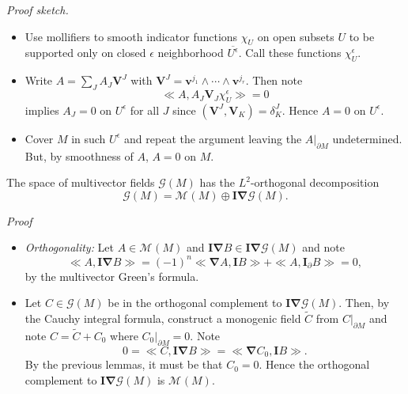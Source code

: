 \documentclass[aspectratio=169,handout]{beamer}
\newcommand{\grad}{\boldsymbol{\nabla}}
\newcommand{\G}{\mathcal{G}}
\newcommand{\blade}[1]{\boldsymbol{#1}}
\newcommand{\multivecinnerproduct}[2]{\ll #1, #2\gg}
\newcommand{\boundary}{{\partial M}}
\newcommand{\pseudoscalar}{\blade{I}}
\newcommand{\monogenicfields}[1]{\mathcal{M}^{#1}(M)}
\begin{document}
\begin{frame}{}
\vfill
\emph{Proof sketch.}
\begin{itemize}
\item Use mollifiers to smooth indicator functions $\chi_U$ on open subsets $U$ to be supported only on closed $\epsilon$ neighborhood $\overline{U^\epsilon}$. Call these functions $\chi_U^\epsilon$.
\item Write $A=\sum_J A_J \blade{V}^J$ with $\blade{V}^J = \blade{v}^{j_1}\wedge \cdots\wedge  \blade{v}^{j_r}$. Then note
    \[
    \multivecinnerproduct{A}{A_J \blade{V}_J \chi_U^\epsilon} = 0
    \] 
    implies $A_J=0$ on $U^\epsilon$ for all $J$ since $(\blade{V}^{J}, \blade{V}_K)=\delta^J_K$. Hence $A=0$ on $U^\epsilon$.
\item Cover $M$ in such $U^\epsilon$ and repeat the argument leaving the $A\vert_\boundary$ undetermined. But, by smoothness of $A$, $A=0$ on $M$.
\end{itemize}
\vfill
\end{frame}

\begin{frame}{}
\vfill
\begin{theorem}
The space of multivector fields $\G(M)$ has the $L^2$-orthogonal decomposition
\[
\G(M) = \monogenicfields{} \oplus \pseudoscalar \grad \G(M).
\]
\end{theorem}
\vfill
\end{frame}

\begin{frame}
\vfill
\emph{Proof}
\begin{itemize}
\item \emph{Orthogonality:} Let $A \in \monogenicfields{}$ and $\pseudoscalar \grad B \in \pseudoscalar \grad \G(M)$ and note
\[
\multivecinnerproduct{A}{\pseudoscalar \grad B} = (-1)^n \multivecinnerproduct{\grad A}{\pseudoscalar B} + \multivecinnerproduct{A}{\pseudoscalar_\partial B} = 0,
\]
by the multivector Green's formula.
\end{itemize}
\vfill
\end{frame}

\begin{frame}{}
\vfill
\begin{itemize}
\item Let $C\in \G(M)$ be in the orthogonal complement to $\pseudoscalar \grad \G(M)$. Then, by the Cauchy integral formula, construct a monogenic field $\tilde{C}$ from $C\vert_\boundary$ and note $C=\tilde{C}+C_0$ where $C_0\vert_\boundary = 0$. Note
\[
0 = \multivecinnerproduct{C}{\pseudoscalar \grad B} = \multivecinnerproduct{\grad C_0}{\pseudoscalar B}.
\]
By the previous lemmas, it must be that $C_0=0$. Hence the orthogonal complement to $\pseudoscalar \grad \G(M)$ is $\monogenicfields{}$.
\end{itemize}
\vfill
\end{frame}
\end{document}
